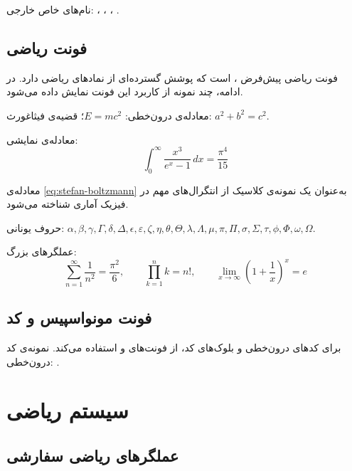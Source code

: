 \documentclass{matinbook}
\begin{document}
نام‌های خاص خارجی: ، ،
، .

\section{فونت ریاضی}
\label{sec:font-math}

فونت ریاضی پیش‌فرض ،  است که
پوشش گسترده‌ای از نمادهای ریاضی دارد. در ادامه، چند نمونه
از کاربرد این فونت نمایش داده می‌شود.

معادله‌ی درون‌خطی: $E = mc^2$؛ قضیه‌ی فیثاغورث: $a^2 + b^2 = c^2$.

معادله‌ی نمایشی:
\begin{equation}
    \int_{0}^{\infty} \frac{x^3}{e^x - 1} \,dx = \frac{\pi^4}{15}
    \label{eq:stefan-boltzmann}
\end{equation}

معادله‌ی \cref{eq:stefan-boltzmann} به‌عنوان یک نمونه‌ی کلاسیک
از انتگرال‌های مهم در فیزیک آماری شناخته می‌شود.

حروف یونانی: $\alpha, \beta, \gamma, \Gamma, \delta, \Delta,
\epsilon, \varepsilon, \zeta, \eta, \theta, \Theta, \lambda,
\Lambda, \mu, \pi, \Pi, \sigma, \Sigma, \tau, \phi, \Phi,
\omega, \Omega$.

عملگرهای بزرگ:
\[
    \sum_{n=1}^{\infty} \frac{1}{n^2} = \frac{\pi^2}{6}, \qquad
    \prod_{k=1}^{n} k = n!, \qquad
    \lim_{x \to \infty} \left(1 + \frac{1}{x}\right)^x = e
\]

\section{فونت مونواسپیس و کد}
\label{sec:font-mono}

برای کدهای درون‌خطی و بلوک‌های کد،  از فونت‌های
 و  استفاده می‌کند.
نمونه‌ی کد درون‌خطی: .

\chapter{سیستم ریاضی}
\label{chap:math}

\section{عملگرهای ریاضی سفارشی}
\label{sec:math-operators}
\end{document}
